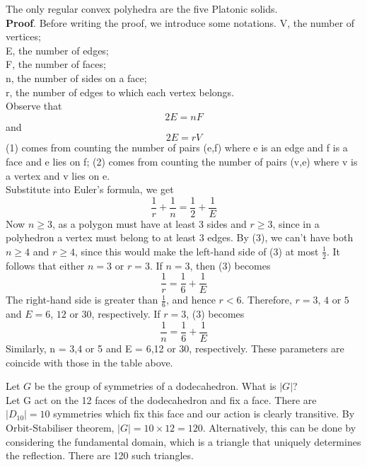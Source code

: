 \documentclass[../main.tex]{subfiles}
\begin{document}
\begin{theorem}
The only regular convex polyhedra are the five Platonic solids.\\
\textbf{Proof}. Before writing the proof, we introduce some notations.
V, the number of vertices;\\
E, the number of edges;\\
F, the number of faces;\\
n, the number of sides on a face;\\
r, the number of edges to which each vertex belongs.\\
Observe that 
\begin{equation}\label{eqn_1}
2E=nF
\end{equation}
and
\begin{equation}\label{eqn_2}
2E=rV
\end{equation}
(1) comes from counting the number of pairs (e,f) where e is an edge and f is a face and e lies on f; (2) comes from counting the number of pairs (v,e) where v is a vertex and v lies on e.\\
Substitute into Euler's formula, we get 
\begin{equation}\label{eqn_3}
\frac{1}{r}+\frac{1}{n}=\frac{1}{2}+\frac{1}{E}
\end{equation}
Now $n\geq 3$, as a polygon must have at least $3$ sides and $r\geq 3$, since in a polyhedron a vertex must belong to at least $3$ edges. By (3), we can't have both $n\geq 4$ and $r \geq 4$, since this would make the left-hand side of (3) at most $\frac{1}{2}$.
It follows that either $n = 3$ or $r = 3$.
If $n = 3$, then (3) becomes
\begin{equation}\label{eqn_4}
\frac{1}{r}=\frac{1}{6}+\frac{1}{E}
\end{equation}
The right-hand side is greater than $\frac{1}{6}$, and hence $r < 6$. Therefore, $r = 3$, $4$ or $5$ and $E = 6$, $12$ or $30$, respectively.
If $r = 3$, (3) becomes
\begin{equation}\label{eqn_5}
\frac{1}{n}=\frac{1}{6}+\frac{1}{E}
\end{equation}
Similarly, n = 3,4 or 5 and E = 6,12 or 30, respectively.
These parameters are coincide with those in the table above.

\end{theorem}

\begin{example}
Let $G$ be the group of symmetries of a dodecahedron. What is $|G|$?\\
Let G act on the 12 faces of the dodecahedron and fix a face. There are $|D_{10}|=10$ symmetries which fix this face and our action is clearly transitive. By Orbit-Stabiliser theorem, $|G|=10\times12=120.$
Alternatively, this can be done by considering the fundamental domain, which is a triangle that uniquely determines the reflection. There are 120 such triangles.
\end{example}
\end{document}
